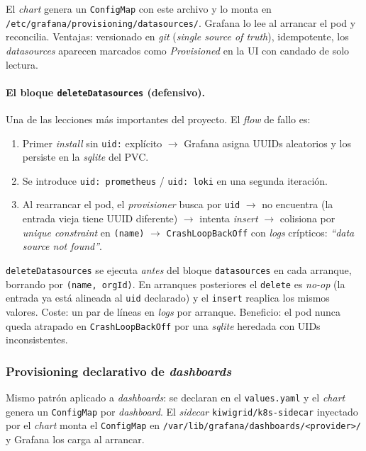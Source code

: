 El \emph{chart} genera un \texttt{ConfigMap} con este archivo y lo monta en \texttt{/etc/grafana/provisioning/datasources/}. Grafana lo lee al arrancar el pod y reconcilia. Ventajas: versionado en \emph{git} (\emph{single source of truth}), idempotente, los \emph{datasources} aparecen marcados como \emph{Provisioned} en la UI con candado de solo lectura.

\paragraph{El bloque \texttt{deleteDatasources} (defensivo).} Una de las lecciones más importantes del proyecto. El \emph{flow} de fallo es:

\begin{enumerate}
  \item Primer \emph{install} sin \texttt{uid:} explícito $\to$ Grafana asigna UUIDs aleatorios y los persiste en la \emph{sqlite} del PVC.
  \item Se introduce \texttt{uid: prometheus} / \texttt{uid: loki} en una segunda iteración.
  \item Al rearrancar el pod, el \emph{provisioner} busca por \texttt{uid} $\to$ no encuentra (la entrada vieja tiene UUID diferente) $\to$ intenta \emph{insert} $\to$ colisiona por \emph{unique constraint} en \texttt{(name)} $\to$ \texttt{CrashLoopBackOff} con \emph{logs} crípticos: \emph{``data source not found''}.
\end{enumerate}

\texttt{deleteDatasources} se ejecuta \emph{antes} del bloque \texttt{datasources} en cada arranque, borrando por \texttt{(name, orgId)}. En arranques posteriores el \texttt{delete} es \emph{no-op} (la entrada ya está alineada al \texttt{uid} declarado) y el \texttt{insert} reaplica los mismos valores. Coste: un par de líneas en \emph{logs} por arranque. Beneficio: el pod nunca queda atrapado en \texttt{CrashLoopBackOff} por una \emph{sqlite} heredada con UIDs inconsistentes.

\subsubsection{Provisioning declarativo de \emph{dashboards}}

Mismo patrón aplicado a \emph{dashboards}: se declaran en el \texttt{values.yaml} y el \emph{chart} genera un \texttt{ConfigMap} por \emph{dashboard}. El \emph{sidecar} \texttt{kiwigrid/k8s-sidecar} inyectado por el \emph{chart} monta el \texttt{ConfigMap} en \texttt{/var/lib/grafana/dashboards/<provider>/} y Grafana los carga al arrancar.

